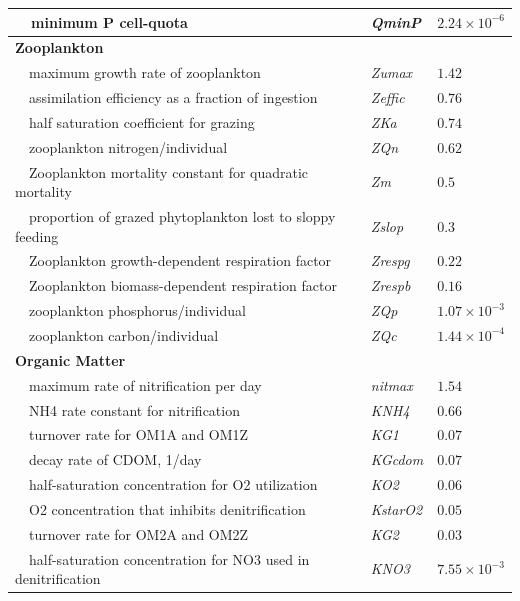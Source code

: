 \documentclass[letterpaper,12pt,oneside]{article}\usepackage[]{graphicx}\usepackage[]{color}
\begin{document}
\begin{table}[!tbp]
{\begin{center}
\begin{tabular}{lll}
~~minimum P cell-quota&\textit{QminP}&$2.24\times 10^{-6}$\tabularnewline
\hline
{\bfseries Zooplankton}&&\tabularnewline
~~maximum growth rate of zooplankton&\textit{Zumax}&$1.42$\tabularnewline
~~assimilation efficiency as a fraction of ingestion&\textit{Zeffic}&$0.76$\tabularnewline
~~half saturation coefficient for grazing&\textit{ZKa}&$0.74$\tabularnewline
~~zooplankton nitrogen/individual&\textit{ZQn}&$0.62$\tabularnewline
~~Zooplankton mortality constant for quadratic mortality&\textit{Zm}&$0.5$\tabularnewline
~~proportion of grazed phytoplankton lost to sloppy feeding&\textit{Zslop}&$0.3$\tabularnewline
~~Zooplankton growth-dependent respiration factor&\textit{Zrespg}&$0.22$\tabularnewline
~~Zooplankton biomass-dependent respiration factor&\textit{Zrespb}&$0.16$\tabularnewline
~~zooplankton phosphorus/individual&\textit{ZQp}&$1.07\times 10^{-3}$\tabularnewline
~~zooplankton carbon/individual&\textit{ZQc}&$1.44\times 10^{-4}$\tabularnewline
\hline
{\bfseries Organic Matter}&&\tabularnewline
~~maximum rate of nitrification per day&\textit{nitmax}&$1.54$\tabularnewline
~~NH4 rate constant for nitrification&\textit{KNH4}&$0.66$\tabularnewline
~~turnover rate for OM1A and OM1Z&\textit{KG1}&$0.07$\tabularnewline
~~decay rate of CDOM, 1/day&\textit{KGcdom}&$0.07$\tabularnewline
~~half-saturation concentration for O2 utilization&\textit{KO2}&$0.06$\tabularnewline
~~O2 concentration that inhibits denitrification&\textit{KstarO2}&$0.05$\tabularnewline
~~turnover rate for OM2A and OM2Z&\textit{KG2}&$0.03$\tabularnewline
~~half-saturation concentration for NO3 used in denitrification&\textit{KNO3}&$7.55\times 10^{-3}$\tabularnewline
\hline
\end{tabular}\end{center}}

\end{table}
\end{document}
